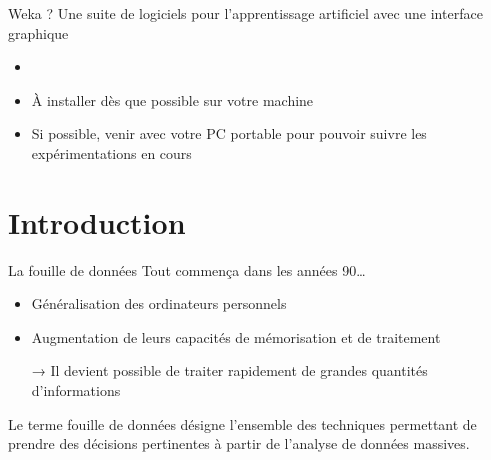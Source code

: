 \documentclass[hyperref={unicode}, xcolor={svgnames}, french]{beamer}
\begin{document}
\begin{frame}{Weka ?}
    Une suite de logiciels pour l'apprentissage artificiel avec une interface graphique
    \begin{itemize}
        \item {}
        \item À installer dès que possible sur votre machine
        \item Si possible, venir avec votre PC portable pour pouvoir suivre les expérimentations en cours
    \end{itemize}
\end{frame}



\section*{Introduction}

\begin{frame}{La fouille de données}
    Tout commença dans les années 90…
    \begin{itemize}
        \item Généralisation des ordinateurs personnels
        \item Augmentation de leurs capacités de mémorisation et de traitement
        \item[→] Il devient possible de traiter rapidement de grandes quantités d'informations
    \end{itemize}
    Le terme \alert{fouille de données} désigne l'ensemble des techniques permettant de prendre des décisions pertinentes à partir de l'analyse de \alert{données massives}.
\end{frame}
\end{document}
